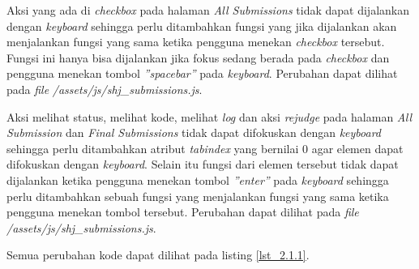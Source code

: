 \begin{itemize}
	Aksi yang ada di \textit{checkbox} pada halaman \textit{All Submissions} tidak dapat dijalankan dengan \textit{keyboard} sehingga perlu ditambahkan fungsi yang jika dijalankan akan menjalankan fungsi yang sama ketika pengguna menekan \textit{checkbox} tersebut. Fungsi ini hanya bisa dijalankan jika fokus sedang berada pada \textit{checkbox} dan pengguna menekan tombol \textit{''spacebar''} pada \textit{keyboard}. Perubahan dapat dilihat pada \textit{file} \textit{/assets/js/shj\_submissions.js}.
	
	Aksi melihat status, melihat kode, melihat \textit{log} dan aksi \textit{rejudge} pada halaman \textit{All Submission} dan \textit{Final Submissions} tidak dapat difokuskan dengan \textit{keyboard} sehingga perlu ditambahkan atribut \textit{tabindex} yang bernilai 0 agar elemen dapat difokuskan dengan \textit{keyboard}. Selain itu fungsi dari elemen tersebut tidak dapat dijalankan ketika pengguna menekan tombol \textit{''enter''} pada \textit{keyboard} sehingga perlu ditambahkan sebuah fungsi yang menjalankan fungsi yang sama ketika pengguna menekan tombol tersebut. Perubahan dapat dilihat pada \textit{file} \textit{/assets/js/shj\_submissions.js}.
	
	Semua perubahan kode dapat dilihat pada listing \ref{lst_2.1.1}.

\begin{lstlisting}[language=diff, caption=Perubahan untuk mematuhi kriteria 2.1.1, label=lst_2.1.1, basicstyle=\ttfamily, frame=single,
columns=fullflexible, keepspaces=true, breaklines=true]


\end{lstlisting}
\end{itemize}
